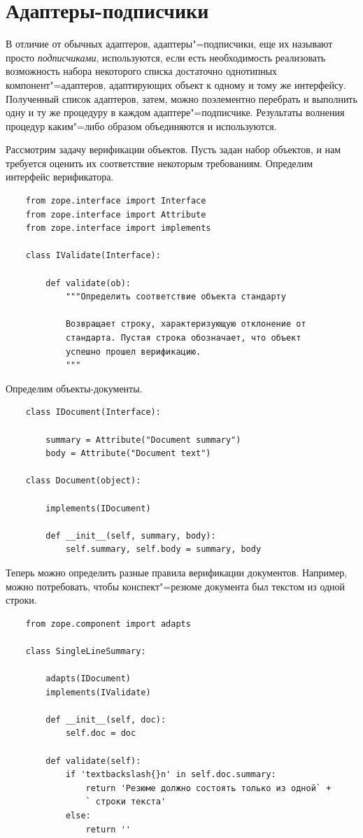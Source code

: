 \documentclass[a4paper,openany,twoside,final]{book}
\providecommand*{\DUroletitlereference}[1]{\textsl{#1}}
\begin{document}
\section{Адаптеры-подписчики%
  \label{id46}%
}

В отличие от обычных адаптеров, адаптеры"=подписчики, еще их называют просто \DUroletitlereference{подписчиками}, используются, если есть необходимость реализовать возможность набора некоторого списка достаточно однотипных компонент"=адаптеров, адаптирующих объект к одному и тому же интерфейсу.  Полученный список адаптеров, затем, можно поэлементно перебрать и выполнить одну и ту же процедуру в каждом адаптере"=подписчике.  Результаты волнения процедур каким"=либо образом объединяются и используются.

Рассмотрим задачу верификации объектов.  Пусть задан набор объектов, и нам требуется оценить их соответствие некоторым требованиям.  Определим интерфейс верификатора.

\begin{verbatim}
    from zope.interface import Interface
    from zope.interface import Attribute
    from zope.interface import implements

    class IValidate(Interface):

        def validate(ob):
            """Определить соответствие объекта стандарту

            Возвращает строку, характеризующую отклонение от
            стандарта. Пустая строка обозначает, что объект
            успешно прошел верификацию.
            """
\end{verbatim}

Определим объекты-документы.

\begin{verbatim}
    class IDocument(Interface):

        summary = Attribute("Document summary")
        body = Attribute("Document text")

    class Document(object):

        implements(IDocument)

        def __init__(self, summary, body):
            self.summary, self.body = summary, body
\end{verbatim}

Теперь можно определить разные правила верификации документов.  Например, можно потребовать, чтобы конспект"=резюме документа был текстом из одной строки.

\begin{verbatim}
    from zope.component import adapts

    class SingleLineSummary:

        adapts(IDocument)
        implements(IValidate)

        def __init__(self, doc):
            self.doc = doc

        def validate(self):
            if 'textbackslash{}n' in self.doc.summary:
                return 'Резюме должно состоять только из одной` +
                ` строки текста'
            else:
                return ''
\end{verbatim}
\end{document}
